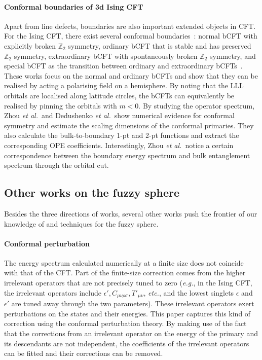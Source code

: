 \documentclass{timesjhep}
\begin{document}
\paragraph{Conformal boundaries of 3d Ising CFT~\cite{Zhou2024Jul,Dedushenko2024}}

Apart from line defects, boundaries are also important extended objects in CFT. For the Ising CFT, there exist several conformal boundaries~: normal bCFT with explicitly broken $\mathbb{Z}_2$ symmetry, ordinary bCFT that is stable and has preserved $\mathbb{Z}_2$ symmetry, extraordinary bCFT with spontaneously broken $\mathbb{Z}_2$ symmetry, and special bCFT as the transition between ordinary and extraordinary bCFTs~\cite{Metlitski2020IsingBd,Krishnan2023IsingBd,Giombi2023IsingBd}. These works focus on the normal and ordinary bCFTs and show that they can be realised by acting a polarising field on a hemisphere. By noting that the LLL orbitals are localised along latitude circles, the bCFTs can equivalently be realised by pinning the orbitals with $m<0$. By studying the operator spectrum, Zhou \textit{et al.}~and Dedushenko \textit{et al.}~show numerical evidence for conformal symmetry and estimate the scaling dimensions of the conformal primaries. They also calculate the bulk-to-boundary 1-pt and 2-pt functions and extract the corresponding OPE coefficients. Interestingly, Zhou \textit{et al.}~notice a certain correspondence between the boundary energy spectrum and bulk entanglement spectrum through the orbital cut.

\subsection{Other works on the fuzzy sphere}

Besides the three directions of works, several other works push the frontier of our knowledge of and techniques for the fuzzy sphere.

\paragraph{Conformal perturbation~\cite{Laeuchli2025}}

The energy spectrum calculated numerically at a finite size does not coincide with that of the CFT. Part of the finite-size correction comes from the higher irrelevant operators that are not precisely tuned to zero (\textit{e.g.}, in the Ising CFT, the irrelevant operators include $\epsilon', C_{\mu\nu\rho\sigma}, T'_{\mu\nu}$, \textit{etc.}, and the lowest singlets $\epsilon$ and $\epsilon'$ are tuned away through the two parameters). These irrelevant operators exert perturbations on the states and their energies. This paper captures this kind of correction using the conformal perturbation theory. By making use of the fact that the corrections from an irrelevant operator on the energy of the primary and its descendants are not independent, the coefficients of the irrelevant operators can be fitted and their corrections can be removed.
\end{document}
